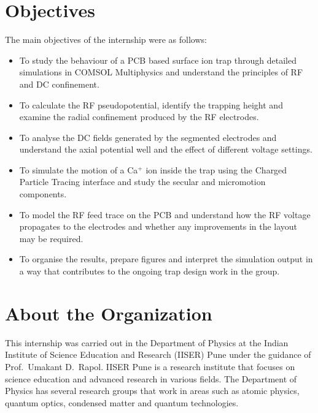 \documentclass[12pt,a4paper]{report}
\begin{document}
\chapter*{Objectives}

The main objectives of the internship were as follows:

\begin{itemize}
    \item To study the behaviour of a PCB based surface ion trap through detailed simulations in COMSOL Multiphysics and understand the principles of RF and DC confinement.
    
    \item To calculate the RF pseudopotential, identify the trapping height and examine the radial confinement produced by the RF electrodes.
    
    \item To analyse the DC fields generated by the segmented electrodes and understand the axial potential well and the effect of different voltage settings.
    
    \item To simulate the motion of a Ca$^{+}$ ion inside the trap using the Charged Particle Tracing interface and study the secular and micromotion components.
    
    \item To model the RF feed trace on the PCB and understand how the RF voltage propagates to the electrodes and whether any improvements in the layout may be required.
    
    \item To organise the results, prepare figures and interpret the simulation output in a way that contributes to the ongoing trap design work in the group.
\end{itemize}

\chapter*{About the Organization}

This internship was carried out in the Department of Physics at the Indian Institute of Science Education and Research (IISER) Pune under the guidance of Prof.\ Umakant D.\ Rapol. IISER Pune is a research institute that focuses on science education and advanced research in various fields. The Department of Physics has several research groups that work in areas such as atomic physics, quantum optics, condensed matter and quantum technologies.
\end{document}
